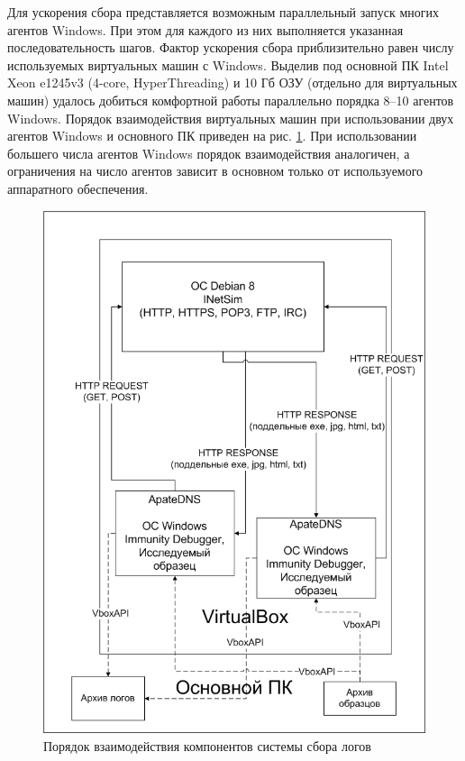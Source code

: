 Для ускорения сбора представляется возможным параллельный запуск многих агентов Windows. При этом для каждого из них выполняется указанная последовательность шагов. Фактор ускорения сбора приблизительно равен числу используемых виртуальных машин с Windows. Выделив под основной ПК Intel Xeon e1245v3 (4-core, HyperThreading) и 10 Гб ОЗУ (отдельно для виртуальных машин) удалось добиться комфортной работы параллельно порядка 8--10 агентов Windows. Порядок взаимодействия виртуальных машин при использовании двух агентов Windows и основного ПК приведен на рис. \ref {fig:vmcycle}. При использовании большего числа агентов Windows порядок взаимодействия аналогичен, а ограничения на число агентов зависит в основном только от используемого аппаратного обеспечения.
\begin {figure}[H]
	\centering
	\includegraphics[width=\linewidth] {img/vmcycle.png}
	\caption {Порядок взаимодействия компонентов системы сбора логов}
	\label {fig:vmcycle}
\end {figure}

